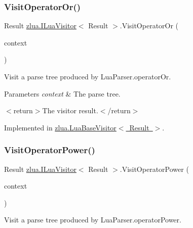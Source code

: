 \subsubsection{\texorpdfstring{Visit\+Operator\+Or()}{VisitOperatorOr()}}
{\footnotesize\ttfamily Result \mbox{\hyperlink{interfacezlua_1_1_i_lua_visitor}{zlua.\+I\+Lua\+Visitor}}$<$ Result $>$.Visit\+Operator\+Or (\begin{DoxyParamCaption}\item[{\mbox{[}\+Not\+Null\mbox{]} \mbox{\hyperlink{classzlua_1_1_lua_parser_1_1_operator_or_context}{Lua\+Parser.\+Operator\+Or\+Context}}}]{context }\end{DoxyParamCaption})}



Visit a parse tree produced by Lua\+Parser.\+operator\+Or. 


\begin{DoxyParams}{Parameters}
{\em context} & The parse tree.\\
\hline
\end{DoxyParams}
$<$return$>$The visitor result.$<$/return$>$ 

Implemented in \mbox{\hyperlink{classzlua_1_1_lua_base_visitor_a1ab126271c0f9f8a86946bb1f38942ee}{zlua.\+Lua\+Base\+Visitor$<$ Result $>$}}.

\mbox{\label{interfacezlua_1_1_i_lua_visitor_aca792a2823d12a1cb5a7dc7cf86550b4}} 
\subsubsection{\texorpdfstring{Visit\+Operator\+Power()}{VisitOperatorPower()}}
{\footnotesize\ttfamily Result \mbox{\hyperlink{interfacezlua_1_1_i_lua_visitor}{zlua.\+I\+Lua\+Visitor}}$<$ Result $>$.Visit\+Operator\+Power (\begin{DoxyParamCaption}\item[{\mbox{[}\+Not\+Null\mbox{]} \mbox{\hyperlink{classzlua_1_1_lua_parser_1_1_operator_power_context}{Lua\+Parser.\+Operator\+Power\+Context}}}]{context }\end{DoxyParamCaption})}



Visit a parse tree produced by Lua\+Parser.\+operator\+Power. 


